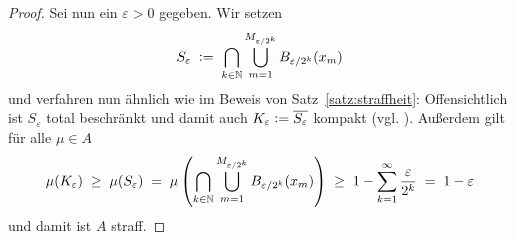 \documentclass[../main/main.tex]{subfiles}
\begin{document}
\begin{proof}
		Sei nun ein $\varepsilon > 0$ gegeben. Wir setzen 
		\[ S_\varepsilon 
		\; \vcentcolon = \; \bigcap_{k \in \mathbb{N}} \bigcup_{m=1}^{M_{\varepsilon / 2^k}} 
		B_{\varepsilon / 2^k}(x_m) \]
		und verfahren nun ähnlich wie im Beweis von Satz~\ref{satz:straffheit}: Offensichtlich ist $S_\varepsilon$ total beschränkt und damit auch 
		$ K_\varepsilon \vcentcolon = \overline{S_\varepsilon}$ kompakt (vgl. \cite[Satz 2.3.8]{Simon.2015}). 
		Außerdem gilt für alle $\mu \in A$
		\[
		\mu(K_\varepsilon) \; \geq \; \mu(S_\varepsilon) \; = \; \mu\left(\bigcap_{k \in \mathbb{N}} \bigcup_{m=1}^{M_{\varepsilon / 2^k}} 
		B_{\varepsilon / 2^k}(x_m)\right)
		\; \geq \; 1 - \sum_{k=1}^{\infty} \frac{\varepsilon}{2^k} \; = \; 1 - \varepsilon
		\]
		und damit ist $A$ straff.
	\end{proof}
	
\end{document}
